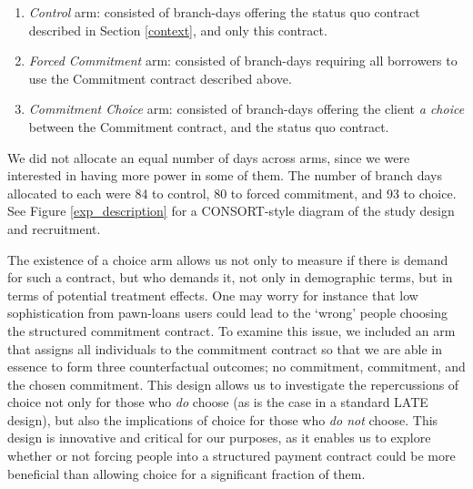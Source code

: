 \documentclass[oneside,11pt]{article}
\begin{document}
\begin{enumerate}
    \item \textit{Control} arm: consisted of branch-days offering the status quo contract described in Section \ref{context}, and only this contract. 
    \item \textit{Forced Commitment} arm: consisted of branch-days requiring all borrowers to use the Commitment contract described above.  
    \item \textit{Commitment Choice} arm: consisted of branch-days offering the client \textit{a choice} between the Commitment contract, and the status quo contract.
\end{enumerate}

We did not allocate an equal number of days across arms, since we were interested in having more power in some of them. The number of branch days allocated to each were 84 to control, 80 to forced commitment, and 93 to choice. See Figure \ref{exp_description} for a CONSORT-style diagram of the study design and recruitment.

The existence of a choice arm allows us not only to measure if there is demand for such a contract, but who demands it, not only in demographic terms, but in terms of potential treatment effects. One may worry for instance that low sophistication from pawn-loans users could lead to the `wrong' people choosing the structured commitment contract. To examine this issue, we included an arm that assigns all individuals to the commitment contract so that we are able in essence to form three counterfactual outcomes; no commitment, commitment, and the chosen commitment. This design allows us to investigate the repercussions of choice not only for those who \textit{do} choose (as is the case in a standard LATE design), but also the implications of choice for those who \textit{do not} choose. This design is innovative and critical for our purposes, as it enables us to explore whether or not forcing people into a structured payment contract could be more beneficial than allowing choice for a significant fraction of them.
\end{document}
